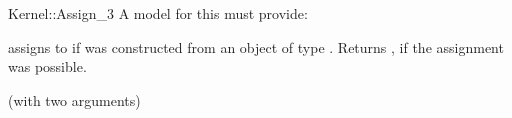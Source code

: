 \begin{ccRefFunctionObjectConcept}{Kernel::Assign_3}
A model for this must provide:


{assigns  to  if 
was constructed from an object of type .
Returns , if the assignment was possible.}

\ccRefines
{} (with two arguments)

\ccSeeAlso
 \\
 \\
  \\

\end{ccRefFunctionObjectConcept}
